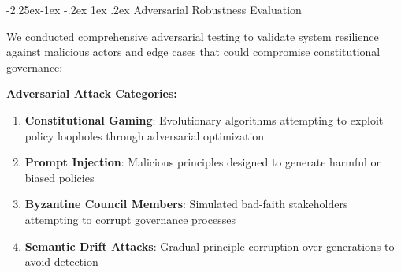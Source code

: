 \documentclass[manuscript,screen,review,anonymous,9pt]{acmart}
\makeatletter
\renewcommand\subsection{\@startsection{subsection}{2}{\z@}%
  {-2.25ex\@plus -1ex \@minus -.2ex}%
  {1ex \@plus .2ex}%
  {\normalfont\large\bfseries}}
\makeatother
\begin{document}
\subsection{Adversarial Robustness Evaluation}
\label{subsec:adversarial_robustness_discussion}

We conducted comprehensive adversarial testing to validate system resilience against malicious actors and edge cases that could compromise constitutional governance:

\textbf{Adversarial Attack Categories:}
\begin{enumerate}
	\item \textbf{Constitutional Gaming}: Evolutionary algorithms attempting to exploit policy loopholes through adversarial optimization
	\item \textbf{Prompt Injection}: Malicious principles designed to generate harmful or biased policies
	\item \textbf{Byzantine Council Members}: Simulated bad-faith stakeholders attempting to corrupt governance processes
	\item \textbf{Semantic Drift Attacks}: Gradual principle corruption over generations to avoid detection
\end{enumerate}
\end{document}

